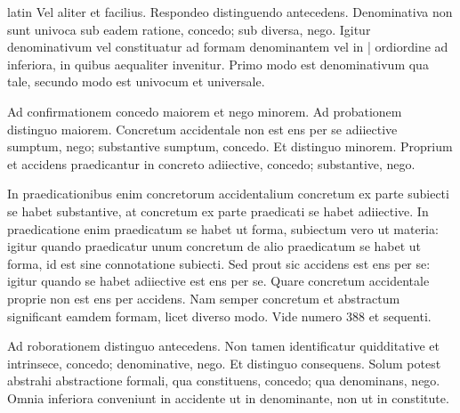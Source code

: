 \begin{otherlanguage*}{latin}
\pstart
  Vel aliter et facilius. Respondeo distinguendo antecedens. Denominativa non sunt univoca sub eadem ratione, concedo; sub diversa, nego. Igitur denominativum vel constituatur ad formam denominantem vel in \textnormal{|}   ordiordine ad inferiora, in quibus aequaliter invenitur. Primo modo est denominativum qua tale, secundo modo est univocum et universale. 
\pend

\pstart
  Ad confirmationem concedo maiorem et nego minorem. Ad probationem distinguo maiorem. Concretum accidentale non est ens per se adiiective sumptum, nego; substantive sumptum, concedo. Et distinguo minorem. Proprium et accidens praedicantur in concreto adiiective, concedo; substantive, nego. 
\pend

\pstart
  In praedicationibus enim concretorum accidentalium concretum ex parte subiecti se habet substantive, at concretum ex parte praedicati se habet adiiective. In praedicatione enim praedicatum se habet ut forma, subiectum vero ut materia: igitur quando praedicatur unum concretum de alio praedicatum se habet ut forma, id est sine connotatione subiecti. Sed prout sic accidens est ens per se: igitur quando se habet adiiective est ens per se. Quare concretum accidentale proprie non est ens per accidens. Nam semper concretum et abstractum significant eamdem formam, licet diverso modo. Vide numero 388 et sequenti. 
\pend

\pstart
  Ad roborationem distinguo antecedens. Non tamen identificatur quidditative et intrinsece, concedo; denominative, nego. Et distinguo consequens. Solum potest abstrahi abstractione formali, qua constituens, concedo; qua denominans, nego. Omnia inferiora conveniunt in accidente ut in denominante, non ut in constitute. 
\pend

        \pstart
        \pend
      

\end{otherlanguage*}
